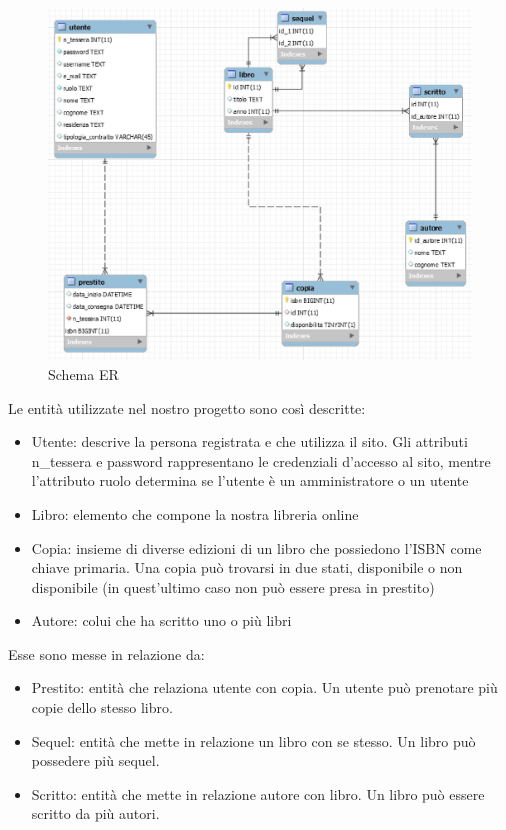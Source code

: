 \documentclass[a4paper,10pt]{article}
\begin{document}
\begin{figure}[H]
	\centering
	\includegraphics[width=0.8\linewidth]{images/ERdiagram}
	\caption[Schema ER]{Schema ER}
	\label{fig:re}
\end{figure}

Le entità utilizzate nel nostro progetto sono così descritte:

\begin{itemize}
	\item Utente: descrive la persona registrata e che utilizza il sito. Gli attributi n\_tessera e password rappresentano le credenziali d'accesso al sito, mentre l'attributo ruolo determina se l'utente è un amministratore o un utente
	\item Libro: elemento che compone la nostra libreria online
	\item Copia: insieme di diverse edizioni di un libro che possiedono l'ISBN come chiave primaria. Una copia può trovarsi in due stati, disponibile o non disponibile (in quest'ultimo caso non può essere presa in prestito)
	\item Autore: colui che ha scritto uno o più libri
\end{itemize}

Esse sono messe in relazione da:
\begin{itemize}
	\item Prestito: entità che relaziona utente con copia. Un utente può prenotare più copie dello stesso libro.
	\item Sequel: entità che mette in relazione un libro con se stesso. Un libro può possedere più sequel.
	\item Scritto: entità che mette in relazione autore con libro. Un libro può essere scritto da più autori.
\end{itemize}
\end{document}

